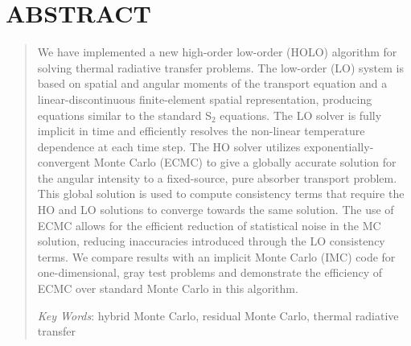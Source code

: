 \documentclass{mc2013}
\begin{document}
\section*{ABSTRACT} 
\begin{quote}
\begin{small}
We have implemented a new high-order low-order (HOLO) algorithm for solving
thermal radiative transfer problems.  The low-order (LO) system is based on spatial
and angular moments of the transport equation and a linear-discontinuous
finite-element spatial representation, producing equations similar to the standard
S$_2$ equations.  
The LO solver is fully implicit in time and efficiently resolves the non-linear
temperature dependence at each time step.   The HO solver
utilizes exponentially-convergent Monte Carlo (ECMC) to give a globally accurate solution
for the angular intensity to a fixed-source, pure absorber transport problem.  This global solution is used to compute consistency terms
that require the HO and LO solutions to converge towards the same solution.  The use of ECMC
allows for the efficient reduction of statistical noise in the MC solution, reducing
inaccuracies introduced through the LO consistency
terms.  We compare results with an
implicit Monte Carlo (IMC) code for one-dimensional, gray test problems and 
demonstrate the efficiency of ECMC over standard Monte Carlo in this algorithm.

\emph{Key Words}: hybrid Monte Carlo, residual Monte Carlo, thermal radiative transfer

\end{small} 
\end{quote}

\setlength{\baselineskip}{14pt}
\normalsize

\end{document}
